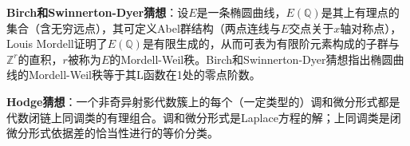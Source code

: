 \par \textbf{Birch和Swinnerton-Dyer猜想}：设$E$是一条椭圆曲线，$E(\mathbb{Q})$是其上有理点的集合（含无穷远点），其可定义Abel群结构（两点连线与$E$交点关于$x$轴对称点），Louis Mordell证明了$E(\mathbb{Q})$是有限生成的，从而可表为有限阶元素构成的子群与$\mathbb{Z}^r$的直积，$r$被称为$E$的Mordell-Weil秩。Birch和Swinnerton-Dyer猜想指出椭圆曲线的Mordell-Weil秩等于其L函数在1处的零点阶数。

\par \textbf{Hodge猜想}：一个非奇异射影代数簇上的每个（一定类型的）调和微分形式都是代数闭链上同调类的有理组合。调和微分形式是Laplace方程的解；上同调类是闭微分形式依据差的恰当性进行的等价分类。

